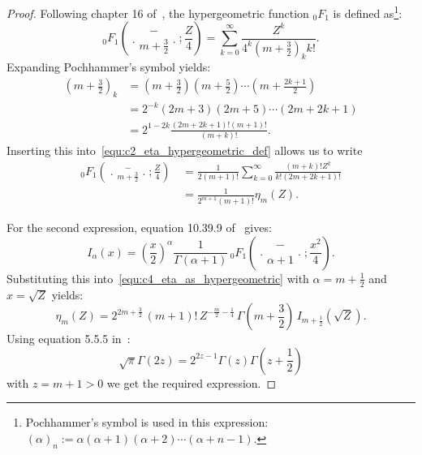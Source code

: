 \begin{proof}
    Following chapter 16 of~\cite{nist_dlmf}, the hypergeometric function ${}_0 F_1$ is defined as\footnote{Pochhammer's symbol is used in this expression: $( \alpha )_n := \alpha(\alpha + 1)(\alpha + 2)\cdots(\alpha + n - 1)$.}:
    \begin{equation}\label{equ:c2_eta_hypergeometric_def}
        {}_0 F_1\left(\genfrac..{0pt}{}{ - }{m+\frac{3}{2}}; \frac{Z}{4}\right) = \sum_{k=0}^{\infty} \frac{Z^k}{4^k\left(m+\frac{3}{2}\right)_k k!}\text{.}
    \end{equation}
    Expanding Pochhammer's symbol yields:
    \begin{align*}
        \left(m+\frac{3}{2}\right)_k & = \left(m+\frac{3}{2}\right)\left(m+\frac{5}{2}\right)\cdots\left(m+\frac{2k + 1}{2}\right) \\
                                     & = 2^{-k} \left(2m+3\right)\left(2m+5\right)\cdots\left(2m + 2k + 1\right)                   \\
                                     & = 2^{1 - 2k} \frac{(2m + 2k +1)!(m+1)!}{(m+k)!}\text{.}
    \end{align*}
    Inserting this into~\eqref{equ:c2_eta_hypergeometric_def} allows us to write
    \begin{align*}
        {}_0 F_1\left(\genfrac..{0pt}{}{ - }{m+\frac{3}{2}}; \frac{Z}{4}\right)\, & = \frac{1}{2(m+1)!}\sum_{k=0}^{\infty} \frac{(m+k)!Z^k}{k!(2m+2k+1)!} \\
                                                                                  & = \frac{1}{2^{m+1}(m+1)!}\eta_m(Z)\text{.}
    \end{align*}

    For the second expression, equation 10.39.9	of~\cite{nist_dlmf} gives:
    $$
        I_\alpha(x) = \left(\frac{x}{2}\right)^\alpha \frac{1}{\Gamma(\alpha + 1)}\,{}_0 F_1\left(\genfrac..{0pt}{}{ - }{\alpha + 1}; \frac{x^ 2}{4}\right)\text{.}
    $$
    Substituting this into~\eqref{equ:c4_eta_as_hypergeometric} with $\alpha = m+\frac{1}{2}$ and $x = \sqrt{Z}$ yields:
    $$
        \eta_m(Z) = 2^{2m+\frac{3}{2}} \, (m+1)! \, Z^{-\frac{m}{2} - \frac{1}{4}} \, \Gamma\left(m + \frac{3}{2}\right) \, I_{m+\frac{1}{2}}\left(\sqrt{Z}\right)\text{.}
    $$
    Using equation 5.5.5 in~\cite{nist_dlmf}:
    $$
        \sqrt{\pi} \Gamma(2z) = 2^{2z-1} \Gamma(z)\Gamma\left(z+\frac{1}{2}\right)
    $$
    with $z = m + 1 > 0$ we get the required expression.
\end{proof}

